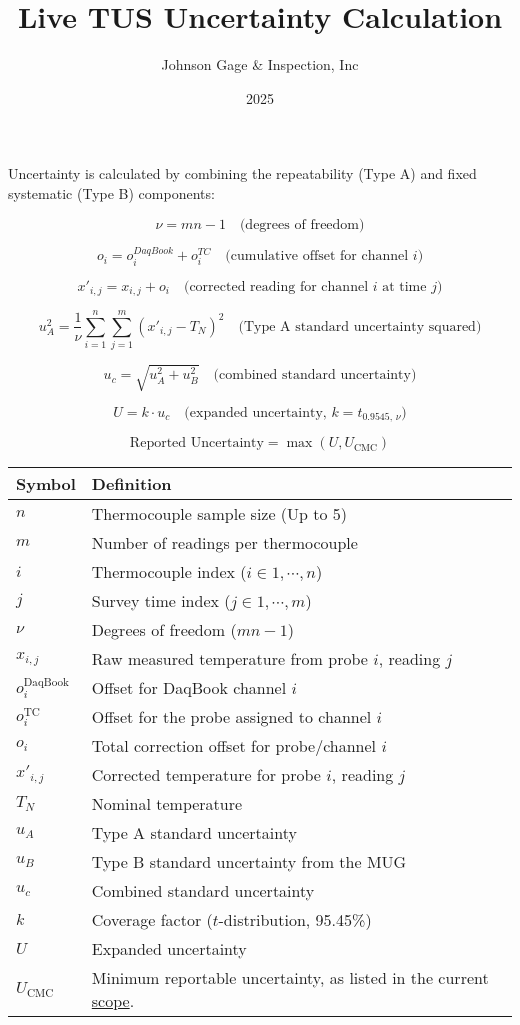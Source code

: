 \documentclass{article}
\title{Live TUS Uncertainty Calculation}
\author{Johnson Gage \& Inspection, Inc}
\date{2025}
\begin{document}
\maketitle

Uncertainty is calculated by combining the repeatability (Type A) and fixed systematic (Type B) components:

\[
\nu = m n - 1
\quad \text{(degrees of freedom)}
\]

\[
o_i = o^{DaqBook}_i + o^{TC}_i
\quad\text{(cumulative offset for channel $i$)}
\]

\[
x'_{i,j} = x_{i,j} + o_i
\quad\text{(corrected reading for channel $i$ at time $j$)}
\]

\[
u_A^2 = \frac{1}{\nu} \sum_{i=1}^{n} \sum_{j=1}^{m} (x'_{i,j} - T_N)^2
\quad \text{(Type A standard uncertainty squared)}
\]

\[
u_c = \sqrt{u_A^2 + u_B^2}
\quad \text{(combined standard uncertainty)}
\]

\[
U = k \cdot u_c
\quad \text{(expanded uncertainty, } k = t_{0.9545,\, \nu} \text{)}
\]

\[
\boxed{\text{Reported Uncertainty} = \max\left(U, U_{\mathrm{CMC}}\right)}
\]

\vspace{1em}
\begin{tabular}{@{}ll@{}}
\toprule
Symbol & Definition \\
\midrule
\( n \)     & Thermocouple sample size (Up to 5) \\
\( m \)     & Number of readings per thermocouple \\
\( i \)     & Thermocouple index ($i \in 1,\cdots,n$) \\
\( j \)     & Survey time index ($j \in 1,\cdots,m$) \\
\( \nu \)   & Degrees of freedom ($mn - 1$) \\
\( x_{i,j} \) & Raw measured temperature from probe $i$, reading $j$ \\
\( o^{\mathrm{DaqBook}}_i \) & Offset for DaqBook channel \( i \) \\
\( o^{\mathrm{TC}}_i \) & Offset for the probe assigned to channel \( i \) \\
\( o_i \)   & Total correction offset for probe/channel \( i \) \\
\( x'_{i,j} \) & Corrected temperature for probe \( i \), reading \( j \) \\
\( T_N \) & Nominal temperature \\
\( u_A \)   & Type A standard uncertainty \\
\( u_B \)   & Type B standard uncertainty from the MUG \\
\( u_c \)   & Combined standard uncertainty \\
\( k \)     & Coverage factor (\( t \)-distribution, 95.45\%) \\
\( U \)     & Expanded uncertainty \\
$U_{\mathrm{CMC}}$ & Minimum reportable uncertainty, as listed in the current \href{https://customer.a2la.org/index.cfm?event=directory.detail&labPID=46ECE43E-423E-465E-8FBB-36DC011ED988}{scope}.\\
\bottomrule
\end{tabular}
\end{document}
